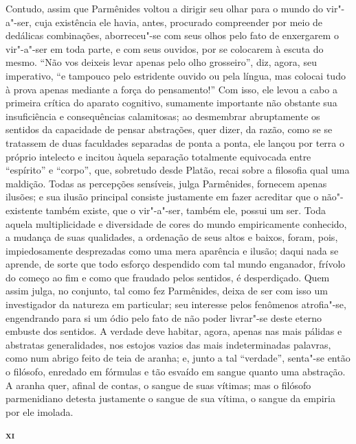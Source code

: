 Contudo, assim que Parmênides voltou a dirigir seu olhar para o mundo do
vir"-a"-ser, cuja existência ele havia, antes, procurado compreender por meio
de dedálicas combinações, aborreceu"-se com seus olhos pelo fato de
enxergarem o vir"-a"-ser em toda parte, e com seus ouvidos, por se colocarem
à escuta do mesmo. ``Não vos deixeis levar apenas pelo olho grosseiro'', diz,
agora, seu imperativo, ``e tampouco pelo estridente ouvido ou pela língua,
mas colocai tudo à prova apenas mediante a força do pensamento!'' Com isso,
ele levou a cabo a primeira crítica do aparato cognitivo, sumamente
importante não obstante sua insuficiência e consequências calamitosas; ao
desmembrar abruptamente os sentidos da capacidade de pensar abstrações, quer
dizer, da razão, como se se tratassem de duas faculdades separadas de ponta a
ponta, ele lançou por terra o próprio intelecto e incitou àquela separação
totalmente equivocada entre ``espírito'' e ``corpo'', que, sobretudo desde
Platão, recai sobre a filosofia qual uma maldição. Todas as percepções
sensíveis, julga Parmênides, fornecem apenas ilusões; e sua ilusão principal
consiste justamente em fazer acreditar que o não"-existente também existe,
que o vir"-a"-ser, também ele, possui um ser. Toda aquela multiplicidade e
diversidade de cores do mundo empiricamente conhecido, a mudança de suas
qualidades, a ordenação de seus altos e baixos, foram, pois, impiedosamente
desprezadas como uma mera aparência e ilusão; daqui nada se aprende, de sorte
que todo esforço despendido com tal mundo enganador, frívolo do começo ao fim
e como que fraudado pelos sentidos, é desperdiçado. Quem assim julga, no
conjunto, tal como fez Parmênides, deixa de ser com isso um investigador da
natureza em particular; seu interesse pelos fenômenos atrofia"-se,
engendrando para si um ódio pelo fato de não poder livrar"-se deste eterno
embuste dos \label{odio} sentidos. A verdade deve habitar, agora, apenas nas
mais pálidas e abstratas generalidades, nos estojos vazios das mais
indeterminadas palavras, como num abrigo feito de teia de aranha; e, junto a
tal ``verdade'', senta"-se então o filósofo, enredado em fórmulas e tão
esvaído em sangue quanto uma abstração. A aranha quer, afinal de contas, o
sangue de suas vítimas; mas o filósofo parmenidiano detesta justamente o
sangue de sua vítima, o sangue da empiria por ele imolada.

\bigskip
\textsc{\textbf{xi}}
\bigskip

